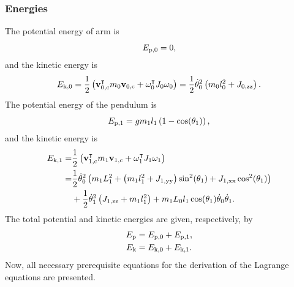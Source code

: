 \subsubsection{Energies}
The potential energy of arm is
\begin{equation}
	E _{\text{p,0}} = 0,
\end{equation}
and the kinetic energy is
\begin{equation}
	E _{\text{k,0}} = \frac{1}{2}\left( \text{\textbf{v}}_{0,\text{c}}^\intercal m_0\textbf{v}_{0,\text{c}} + \omega_0^\intercal J_0\omega_0  \right) = 
	\frac{1}{2}\dot{\theta}_0^2\left(  m_0l_0^2+J_{0,\text{zz}}  \right).
\end{equation}
The potential energy of the pendulum is
\begin{equation}
E _{\text{p,1}} = gm_1l_1\left( 1-\cos(\theta_1) \right),
\end{equation}
and the kinetic energy is
\begin{equation}
\begin{split}
	E _{\text{k,1}} = &\frac{1}{2}\left( \text{\textbf{v}}_{1,\text{c}}^\intercal m_1\textbf{v}_{1,\text{c}} + \omega_1^\intercal J_1\omega_1  \right)\\
	= &\frac{1}{2}\dot{\theta}_0^2\left( m_1L_1^2+\left( m_1l_1^2+J_{1,\text{yy}} \right)\sin^2(\theta_1)+J_{1,\text{xx}}\cos^2(\theta_1) \right)\\
	&+\frac{1}{2}\dot{\theta}_1^2\left(  J_{1,\text{zz}}+m_1l_1^2  \right)+m_1L_0l_1\cos(\theta_1)\dot{\theta}_0\dot{\theta}_1.
\end{split}
\end{equation}
The total potential and kinetic energies are given, respectively, by
\begin{subequations}
	\begin{align}
		E _{\text{p}} &= E _{\text{p,0}} + E _{\text{p,1}}, \\
		E _{\text{k}} &= E _{\text{k,0}} + E _{\text{k,1}}.
	\end{align}
\end{subequations}
Now, all necessary prerequisite equations for the derivation of the Lagrange equations are presented.
